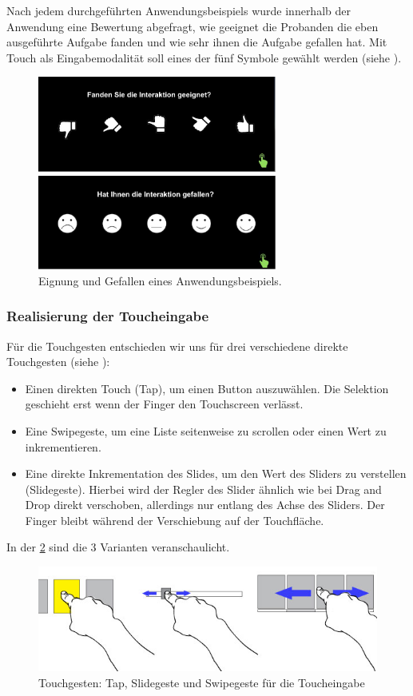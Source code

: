 Nach jedem durchgeführten Anwendungsbeispiels wurde innerhalb der Anwendung eine Bewertung abgefragt, wie geeignet die Probanden die eben ausgeführte Aufgabe fanden und wie sehr ihnen die Aufgabe gefallen hat. 
Mit Touch als Eingabemodalität soll eines der fünf Symbole gewählt werden (siehe ).
\begin{figure}[ht]
	\centering
		\includegraphics[width=0.7\textwidth]{img/Smileys.JPG}
	\caption[Eignung und Gefallen eines Anwendungsbeispiels]{Eignung und Gefallen eines Anwendungsbeispiels. 
}
	\label{fig:Smileys}
\end{figure}

\subsubsection[Touch]{Realisierung der Toucheingabe} 
Für die Touchgesten entschieden wir uns für drei verschiedene direkte Touchgesten (siehe ):
\begin{itemize}
\item Einen direkten Touch (Tap), um einen Button auszuwählen. 
Die Selektion geschieht erst wenn der Finger den Touchscreen verlässt. 
\item Eine Swipegeste, um eine Liste seitenweise zu scrollen oder einen Wert zu inkrementieren.
\item Eine direkte Inkrementation des Slides, um den Wert des Sliders zu verstellen (Slidegeste).
Hierbei wird der Regler des Slider ähnlich wie bei Drag and Drop direkt verschoben, allerdings nur entlang des Achse des Sliders.
Der Finger bleibt während der Verschiebung auf der Touchfläche.
\end{itemize}
In der \ref{fig:TouchGestures} sind die 3 Varianten veranschaulicht.
\begin{figure}[ht]
	\centering
		\includegraphics[width=1\textwidth]{img/TouchGestures.jpg}
	\caption{Touchgesten: Tap, Slidegeste und Swipegeste für die Toucheingabe}
	\label{fig:TouchGestures}
\end{figure}

